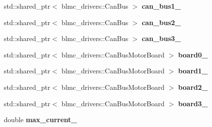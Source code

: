 \begin{DoxyCompactItemize}
\item 
std\+::shared\+\_\+ptr$<$ blmc\+\_\+drivers\+::\+Can\+Bus $>$ {\bfseries can\+\_\+bus1\+\_\+}\hypertarget{classblmc__robots_1_1TestBench8Motors_a9b4a13816d05e28f40704dbb4d5b3493}{}\label{classblmc__robots_1_1TestBench8Motors_a9b4a13816d05e28f40704dbb4d5b3493}

\item 
std\+::shared\+\_\+ptr$<$ blmc\+\_\+drivers\+::\+Can\+Bus $>$ {\bfseries can\+\_\+bus2\+\_\+}\hypertarget{classblmc__robots_1_1TestBench8Motors_a03c639acbe8e378ec5f0abcf75d57ffd}{}\label{classblmc__robots_1_1TestBench8Motors_a03c639acbe8e378ec5f0abcf75d57ffd}

\item 
std\+::shared\+\_\+ptr$<$ blmc\+\_\+drivers\+::\+Can\+Bus $>$ {\bfseries can\+\_\+bus3\+\_\+}\hypertarget{classblmc__robots_1_1TestBench8Motors_a7ef6e4ecd491d5b038155819adb017e0}{}\label{classblmc__robots_1_1TestBench8Motors_a7ef6e4ecd491d5b038155819adb017e0}

\item 
std\+::shared\+\_\+ptr$<$ blmc\+\_\+drivers\+::\+Can\+Bus\+Motor\+Board $>$ {\bfseries board0\+\_\+}\hypertarget{classblmc__robots_1_1TestBench8Motors_a0b1cb9e8d84ef3d0b2df34adb40e9c15}{}\label{classblmc__robots_1_1TestBench8Motors_a0b1cb9e8d84ef3d0b2df34adb40e9c15}

\item 
std\+::shared\+\_\+ptr$<$ blmc\+\_\+drivers\+::\+Can\+Bus\+Motor\+Board $>$ {\bfseries board1\+\_\+}\hypertarget{classblmc__robots_1_1TestBench8Motors_a41d3e420d16362137e340ce8b13b4170}{}\label{classblmc__robots_1_1TestBench8Motors_a41d3e420d16362137e340ce8b13b4170}

\item 
std\+::shared\+\_\+ptr$<$ blmc\+\_\+drivers\+::\+Can\+Bus\+Motor\+Board $>$ {\bfseries board2\+\_\+}\hypertarget{classblmc__robots_1_1TestBench8Motors_a1744f0e28bc2d3a1dd6333392b1ca1cf}{}\label{classblmc__robots_1_1TestBench8Motors_a1744f0e28bc2d3a1dd6333392b1ca1cf}

\item 
std\+::shared\+\_\+ptr$<$ blmc\+\_\+drivers\+::\+Can\+Bus\+Motor\+Board $>$ {\bfseries board3\+\_\+}\hypertarget{classblmc__robots_1_1TestBench8Motors_ac47ed8b0deb7a22bacdbdc922e541163}{}\label{classblmc__robots_1_1TestBench8Motors_ac47ed8b0deb7a22bacdbdc922e541163}

\item 
double {\bfseries max\+\_\+current\+\_\+}\hypertarget{classblmc__robots_1_1TestBench8Motors_a1ecda19afe926a4ed3aed04acfc23986}{}\label{classblmc__robots_1_1TestBench8Motors_a1ecda19afe926a4ed3aed04acfc23986}


\end{DoxyCompactItemize}
